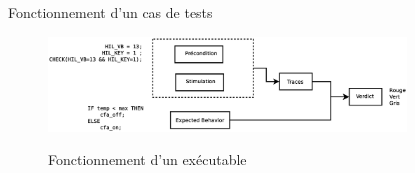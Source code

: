\begin{frame}{Fonctionnement d'un cas de tests}
\begin{figure}[H]
{		}
		\only<8> {
			\includegraphics[width=9.5cm]{images/exe.eps}
		}
		\caption{Fonctionnement d'un exécutable}
	\end{figure}
\end{frame}



